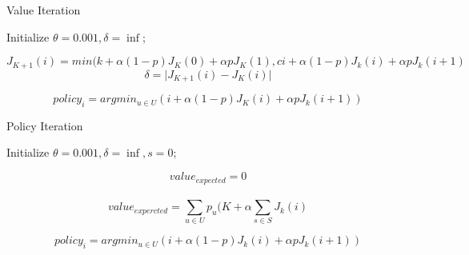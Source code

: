 \documentclass{article}
\begin{document}
\begin{algorithm}[h]
    \caption{Value Iteration}
      \BlankLine
      Initialize $\theta=0.001, \delta=\inf$;
      
      \While{\textnormal{$\delta>\theta$}}
    {
      {
        $$J_{K+1}(i)=min⁡(k+\alpha(1-p) J_K (0)+\alpha pJ_K (1),c i+\alpha(1-p) J_k (i)+\alpha pJ_k (i+1)$$
              $$δ =\vert  J_{K+1} (i)-J_K (i) \vert$$
  
        }
      }
      {$$policy_{i} = argmin_{u\in U} (i+\alpha(1-p) J_K (i)+\alpha p J_k (i+1))$$}
  
  \end{algorithm}

\begin{algorithm}[h]
\caption{Policy Iteration}
  \BlankLine
  Initialize $\theta=0.001, \delta=\inf, s=0$;
  
  \While{\textnormal{$\delta>\theta$}}
{
  {
    $$value_{expected}=0$$ \\
  
    $$value_{expercted}=\sum_{u\in U}p_u (K +\alpha \sum_{s\in S}J_k (i)$$

    }
  }

  {
    $$policy_{i}= argmin_{u∈U} (i+\alpha(1-p) J_k (i)+\alpha pJ_k (i+1))$$}
\end{algorithm}
\end{document}
